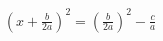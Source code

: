 \documentclass[preview]{standalone}
\begin{document}
\begin{align*}
(x + \frac{b}{2a})^2 = (\frac{b}{2a})^2 - \frac{c}{a}
\end{align*}
\end{document}
